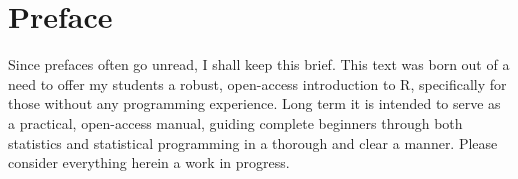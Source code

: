 \chapter*{Preface}
Since prefaces often go unread, I shall keep this brief. This text was born out of a need to offer my students a robust, open-access introduction to R, specifically for those without any programming experience. Long term it is intended to serve as a practical, open-access manual, guiding complete beginners through both statistics and statistical programming in a thorough and clear a manner. Please consider everything herein a work in progress.